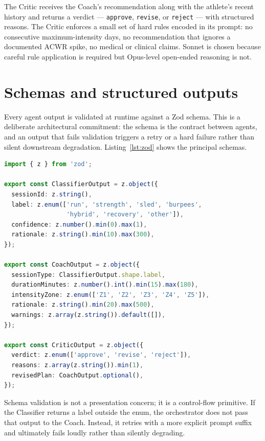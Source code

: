 The Critic receives the Coach's recommendation along with the athlete's recent history and returns a verdict --- \texttt{approve}, \texttt{revise}, or \texttt{reject} --- with structured reasons. The Critic enforces a small set of hard rules encoded in its prompt: no consecutive maximum-intensity days, no recommendation that ignores a documented ACWR spike, no medical or clinical claims. Sonnet is chosen because careful rule application is required but Opus-level open-ended reasoning is not.

\section{Schemas and structured outputs}

Every agent output is validated at runtime against a Zod schema. This is a deliberate architectural commitment: the schema is the contract between agents, and an output that fails validation triggers a retry or a hard failure rather than silent downstream degradation. Listing~\ref{lst:zod} shows the principal schemas.

\begin{lstlisting}[language=TypeScript, caption={Representative Zod schemas. Each agent's output is validated against its schema before being passed to the next stage.}, label={lst:zod}]
import { z } from 'zod';

export const ClassifierOutput = z.object({
  sessionId: z.string(),
  label: z.enum(['run', 'strength', 'sled', 'burpees',
                 'hybrid', 'recovery', 'other']),
  confidence: z.number().min(0).max(1),
  rationale: z.string().min(10).max(300),
});

export const CoachOutput = z.object({
  sessionType: ClassifierOutput.shape.label,
  durationMinutes: z.number().int().min(15).max(180),
  intensityZone: z.enum(['Z1', 'Z2', 'Z3', 'Z4', 'Z5']),
  rationale: z.string().min(20).max(500),
  warnings: z.array(z.string()).default([]),
});

export const CriticOutput = z.object({
  verdict: z.enum(['approve', 'revise', 'reject']),
  reasons: z.array(z.string()).min(1),
  revisedPlan: CoachOutput.optional(),
});
\end{lstlisting}

Schema validation is not a presentation concern; it is a control-flow primitive. If the Classifier returns a label outside the enum, the orchestrator does not pass that output to the Coach. Instead, it retries with a more explicit prompt suffix and ultimately fails loudly rather than silently degrading.

